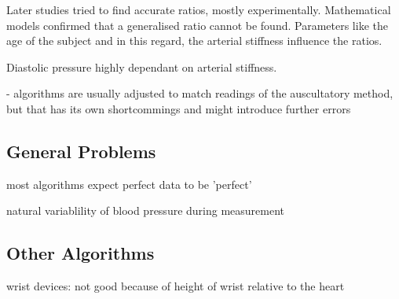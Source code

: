 Later studies tried to find accurate ratios, mostly experimentally. Mathematical models confirmed that a generalised ratio cannot be found. Parameters like the age of the subject and in this regard, the arterial stiffness influence the ratios. \cite{Babbs2012}

Diastolic pressure highly dependant on arterial stiffness. \cite{Babbs2012}



- algorithms are usually adjusted to match readings of the auscultatory method, but that has its own shortcommings and might introduce further errors

\subsection{General Problems}
most algorithms expect perfect data to be 'perfect'

natural variablility of blood pressure during measurement


\subsection{Other Algorithms}

wrist devices: not good because of height of wrist relative to the heart

